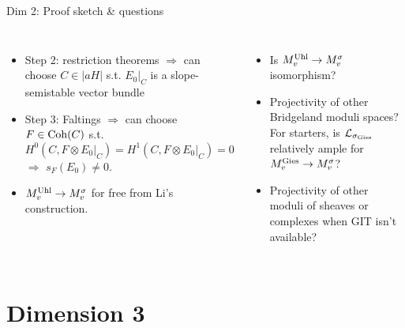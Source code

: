 \documentclass[8pt,handout]{beamer} %
\begin{document}
\begin{frame}[fragile]{Dim 2: Proof sketch \& questions}
\begin{columns}[t]
        \begin{itemize}
            \item<5-> Step 2: restriction theorems $\Rightarrow$ can choose $C \in |a H|$ s.t. $E_0|_C$ is a slope-semistable vector bundle
            \item<6-> Step 3: Faltings $\Rightarrow$ can choose $F \in \mathrm{Coh}(C)$ s.t. 
            \[ H^0(C, F \otimes E_0|_C) = H^1(C, F \otimes E_0|_C) = 0 \]
            $\Rightarrow$ $s_F(E_0) \neq 0$.
            \item<7-> $M^{\text{Uhl}}_v \to M^\sigma_v$ for free from Li's construction.
        \end{itemize}
        \begin{itemize}
            \item<9-> Is $M^{\text{Uhl}}_v \to M^\sigma_v$ isomorphism?
            \item<10-> Projectivity of other Bridgeland moduli spaces? For starters, is $\mathcal{L}_{\sigma_\text{Gies}}$ relatively ample for $M^{\text{Gies}}_v \to M^\sigma_v$?
            \item<11-> Projectivity of other moduli of sheaves or complexes when GIT isn't available?
        \end{itemize}
    \end{columns}
\end{frame}

\section{Dimension 3}
\end{document}
